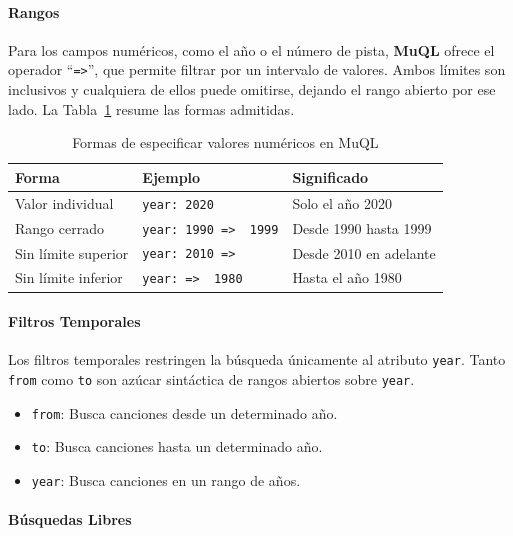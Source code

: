 \paragraph{Rangos}

Para los campos numéricos, como el año o el número de pista, \textbf{MuQL}
ofrece el operador \enquote{\texttt{=>}}, que permite filtrar por un intervalo
de valores. Ambos límites son inclusivos y cualquiera de ellos puede omitirse,
dejando el rango abierto por ese lado. La Tabla~\ref{tab:muql-ranges} resume las
formas admitidas.

\begin{table}[htbp]
	\centering
	\begin{tabular}{lll}
		\hline
		\textbf{Forma}      & \textbf{Ejemplo}              & \textbf{Significado}   \\
		\hline
		Valor individual    & \texttt{year: 2020}           & Solo el año 2020       \\
		Rango cerrado       & \texttt{year: 1990 => \ 1999} & Desde 1990 hasta 1999  \\
		Sin límite superior & \texttt{year: 2010 =>}        & Desde 2010 en adelante \\
		Sin límite inferior & \texttt{year: => \ 1980}      & Hasta el año 1980      \\
		\hline
	\end{tabular}
	\caption{Formas de especificar valores numéricos en MuQL}
	\label{tab:muql-ranges}
\end{table}

\paragraph{Filtros Temporales}

Los filtros temporales restringen la búsqueda únicamente al atributo \texttt{year}. Tanto \texttt{from}
como \texttt{to} son azúcar sintáctica de rangos abiertos sobre \texttt{year}.

\begin{itemize}
	\item \texttt{from}: Busca canciones desde un determinado año.
	\item \texttt{to}: Busca canciones hasta un determinado año.
	\item \texttt{year}: Busca canciones en un rango de años.
\end{itemize}

\paragraph{Búsquedas Libres}

